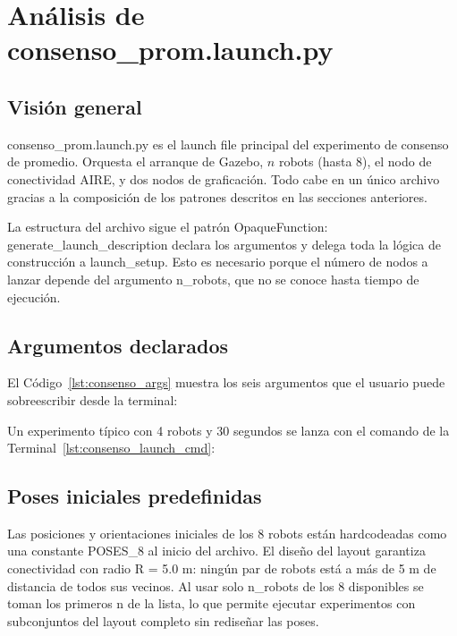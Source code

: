 \section{Análisis de consenso\_prom.launch.py}

\subsection{Visión general}

consenso\_prom.launch.py es el launch file principal del experimento de consenso de promedio. Orquesta el arranque de Gazebo, $n$ robots (hasta 8), el nodo de conectividad AIRE, y dos nodos de graficación. Todo cabe en un único archivo gracias a la composición de los patrones descritos en las secciones anteriores.

La estructura del archivo sigue el patrón OpaqueFunction: generate\_launch\_description declara los argumentos y delega toda la lógica de construcción a launch\_setup. Esto es necesario porque el número de nodos a lanzar depende del argumento n\_robots, que no se conoce hasta tiempo de ejecución.

\subsection{Argumentos declarados}

El Código~\ref{lst:consenso_args} muestra los seis argumentos que el usuario puede sobreescribir desde la terminal:



Un experimento típico con 4 robots y 30 segundos se lanza con el comando de la Terminal~\ref{lst:consenso_launch_cmd}:



\subsection{Poses iniciales predefinidas}

Las posiciones y orientaciones iniciales de los 8 robots están hardcodeadas como una constante POSES\_8 al inicio del archivo. El diseño del layout garantiza conectividad con radio R = 5.0 m: ningún par de robots está a más de 5 m de distancia de todos sus vecinos. Al usar solo n\_robots de los 8 disponibles se toman los primeros n de la lista, lo que permite ejecutar experimentos con subconjuntos del layout completo sin rediseñar las poses.

